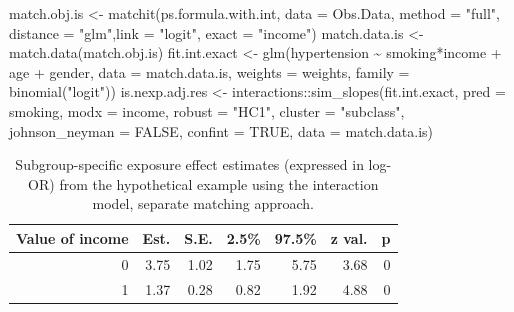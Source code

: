 \documentclass[
  letterpaper,
  DIV=11,
  numbers=noendperiod]{scrreprt}
\newenvironment{Shaded}{\begin{snugshade}}{\end{snugshade}}
\newcommand{\AttributeTok}[1]{\textcolor[rgb]{0.40,0.45,0.13}{#1}}
\newcommand{\ConstantTok}[1]{\textcolor[rgb]{0.56,0.35,0.01}{#1}}
\newcommand{\FunctionTok}[1]{\textcolor[rgb]{0.28,0.35,0.67}{#1}}
\newcommand{\NormalTok}[1]{\textcolor[rgb]{0.00,0.23,0.31}{#1}}
\newcommand{\OtherTok}[1]{\textcolor[rgb]{0.00,0.23,0.31}{#1}}
\newcommand{\SpecialCharTok}[1]{\textcolor[rgb]{0.37,0.37,0.37}{#1}}
\newcommand{\StringTok}[1]{\textcolor[rgb]{0.13,0.47,0.30}{#1}}
\begin{document}
\begin{Shaded}
\begin{Highlighting}[]
\NormalTok{match.obj.is }\OtherTok{\textless{}{-}} \FunctionTok{matchit}\NormalTok{(ps.formula.with.int, }\AttributeTok{data =}\NormalTok{ Obs.Data,}
                      \AttributeTok{method =} \StringTok{"full"}\NormalTok{, }\AttributeTok{distance =} \StringTok{"glm"}\NormalTok{,}\AttributeTok{link =} \StringTok{"logit"}\NormalTok{,}
                      \AttributeTok{exact =} \StringTok{"income"}\NormalTok{)}
\NormalTok{match.data.is }\OtherTok{\textless{}{-}} \FunctionTok{match.data}\NormalTok{(match.obj.is)}
\NormalTok{fit.int.exact }\OtherTok{\textless{}{-}} \FunctionTok{glm}\NormalTok{(hypertension }\SpecialCharTok{\textasciitilde{}}\NormalTok{ smoking}\SpecialCharTok{*}\NormalTok{income }\SpecialCharTok{+}\NormalTok{ age }\SpecialCharTok{+}\NormalTok{ gender, }
                     \AttributeTok{data =}\NormalTok{ match.data.is, }\AttributeTok{weights =}\NormalTok{ weights,}
                     \AttributeTok{family =} \FunctionTok{binomial}\NormalTok{(}\StringTok{"logit"}\NormalTok{))}
\NormalTok{is.nexp.adj.res }\OtherTok{\textless{}{-}}\NormalTok{ interactions}\SpecialCharTok{::}\FunctionTok{sim\_slopes}\NormalTok{(fit.int.exact, }
                                            \AttributeTok{pred =}\NormalTok{ smoking, }
                                            \AttributeTok{modx =}\NormalTok{ income,}
                                            \AttributeTok{robust =} \StringTok{"HC1"}\NormalTok{, }
                                            \AttributeTok{cluster =} \StringTok{"subclass"}\NormalTok{,}
                                            \AttributeTok{johnson\_neyman =} \ConstantTok{FALSE}\NormalTok{, }
                                            \AttributeTok{confint =} \ConstantTok{TRUE}\NormalTok{,}
                                            \AttributeTok{data =}\NormalTok{ match.data.is)}
\end{Highlighting}
\end{Shaded}

\hypertarget{tbl-ints-approach-sep}{}
\begin{table}[!h]
\caption{\label{tbl-ints-approach-sep}Subgroup-specific exposure effect estimates (expressed in log-OR) from
the hypothetical example using the interaction model, separate matching
approach. }\tabularnewline

\centering
\begin{tabular}{rrrrrrr}
\toprule
Value of income & Est. & S.E. & 2.5\% & 97.5\% & z val. & p\\
\midrule
0 & 3.75 & 1.02 & 1.75 & 5.75 & 3.68 & 0\\
1 & 1.37 & 0.28 & 0.82 & 1.92 & 4.88 & 0\\
\bottomrule
\end{tabular}
\end{table}
\end{document}
